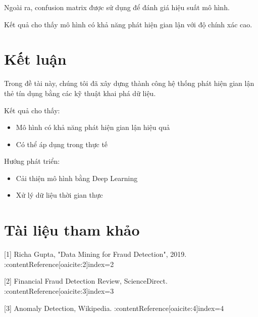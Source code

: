 Ngoài ra, confusion matrix được sử dụng để đánh giá hiệu suất mô hình.

Kết quả cho thấy mô hình có khả năng phát hiện gian lận với độ chính xác cao.
\section{Kết luận}

Trong đề tài này, chúng tôi đã xây dựng thành công hệ thống phát hiện gian lận thẻ tín dụng bằng các kỹ thuật khai phá dữ liệu.

Kết quả cho thấy:
\begin{itemize}
    \item Mô hình có khả năng phát hiện gian lận hiệu quả
    \item Có thể áp dụng trong thực tế
\end{itemize}

Hướng phát triển:
\begin{itemize}
    \item Cải thiện mô hình bằng Deep Learning
    \item Xử lý dữ liệu thời gian thực
\end{itemize}
\section{Tài liệu tham khảo}

[1] Richa Gupta, "Data Mining for Fraud Detection", 2019. :contentReference[oaicite:2]{index=2}

[2] Financial Fraud Detection Review, ScienceDirect. :contentReference[oaicite:3]{index=3}

[3] Anomaly Detection, Wikipedia. :contentReference[oaicite:4]{index=4}

